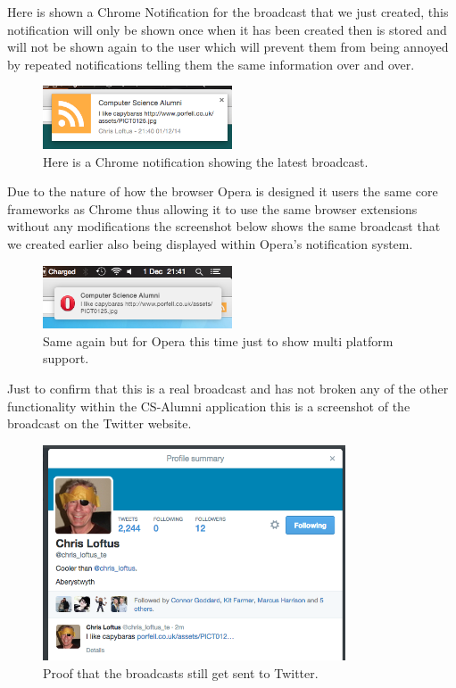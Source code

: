 \documentclass{article}
\begin{document}
Here is shown a Chrome Notification for the broadcast that we just created, this notification will only be shown once when it has been created then is stored and will not be shown again to the user which will prevent them from being annoyed by repeated notifications telling them the same information over and over.

\begin{figure}[H]
\centering
\includegraphics[width=0.5\textwidth]{chromenotification}
\caption{Here is a Chrome notification showing the latest broadcast.}
\end{figure}

Due to the nature of how the browser Opera is designed it users the same core frameworks as Chrome thus allowing it to use the same browser extensions without any modifications the screenshot below shows the same broadcast that we created earlier also being displayed within Opera's notification system.

\begin{figure}[H]
\centering
\includegraphics[width=0.5\textwidth]{operanotification}
\caption{Same again but for Opera this time just to show multi platform support.}
\end{figure}

\newpage
Just to confirm that this is a real broadcast and has not broken any of the other functionality within the CS-Alumni application this is a screenshot of the broadcast on the Twitter website.

\begin{figure}[H]
\centering
\includegraphics[width=0.8\textwidth]{twitterbc}
\caption{Proof that the broadcasts still get sent to Twitter.}
\end{figure}
\end{document}

